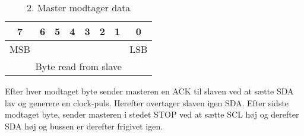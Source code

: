 \begin{table}[H]
\caption{2. Master modtager data}
\centering
\begin{tabular}{|c|c|c|c|c|c|c|c|}
\hline 
\textbf{7} & \textbf{6} & \textbf{5} & \textbf{4} & \textbf{3} & \textbf{2} & \textbf{1} & \textbf{0}\\ 
\hline 
MSB & & & & & & & LSB \\ 
\hline
\multicolumn{8}{|c|}{Byte read from slave} \\
\hline
\end{tabular}
\label{tabel:I2CMasterCommando}
\end{table} 

Efter hver modtaget byte sender masteren en ACK til slaven ved at sætte SDA lav og generere en clock-puls. Herefter overtager slaven igen SDA.
Efter sidste modtaget byte, sender masteren i stedet STOP ved at sætte SCL høj og derefter SDA høj og bussen er derefter frigivet igen.
